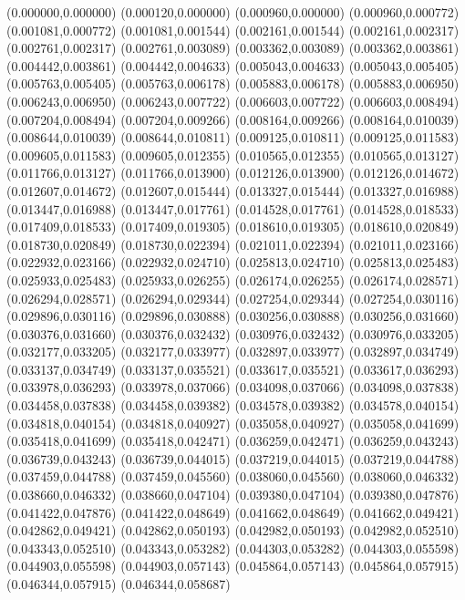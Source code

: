 (0.000000,0.000000)
(0.000120,0.000000)
(0.000960,0.000000)
(0.000960,0.000772)
(0.001081,0.000772)
(0.001081,0.001544)
(0.002161,0.001544)
(0.002161,0.002317)
(0.002761,0.002317)
(0.002761,0.003089)
(0.003362,0.003089)
(0.003362,0.003861)
(0.004442,0.003861)
(0.004442,0.004633)
(0.005043,0.004633)
(0.005043,0.005405)
(0.005763,0.005405)
(0.005763,0.006178)
(0.005883,0.006178)
(0.005883,0.006950)
(0.006243,0.006950)
(0.006243,0.007722)
(0.006603,0.007722)
(0.006603,0.008494)
(0.007204,0.008494)
(0.007204,0.009266)
(0.008164,0.009266)
(0.008164,0.010039)
(0.008644,0.010039)
(0.008644,0.010811)
(0.009125,0.010811)
(0.009125,0.011583)
(0.009605,0.011583)
(0.009605,0.012355)
(0.010565,0.012355)
(0.010565,0.013127)
(0.011766,0.013127)
(0.011766,0.013900)
(0.012126,0.013900)
(0.012126,0.014672)
(0.012607,0.014672)
(0.012607,0.015444)
(0.013327,0.015444)
(0.013327,0.016988)
(0.013447,0.016988)
(0.013447,0.017761)
(0.014528,0.017761)
(0.014528,0.018533)
(0.017409,0.018533)
(0.017409,0.019305)
(0.018610,0.019305)
(0.018610,0.020849)
(0.018730,0.020849)
(0.018730,0.022394)
(0.021011,0.022394)
(0.021011,0.023166)
(0.022932,0.023166)
(0.022932,0.024710)
(0.025813,0.024710)
(0.025813,0.025483)
(0.025933,0.025483)
(0.025933,0.026255)
(0.026174,0.026255)
(0.026174,0.028571)
(0.026294,0.028571)
(0.026294,0.029344)
(0.027254,0.029344)
(0.027254,0.030116)
(0.029896,0.030116)
(0.029896,0.030888)
(0.030256,0.030888)
(0.030256,0.031660)
(0.030376,0.031660)
(0.030376,0.032432)
(0.030976,0.032432)
(0.030976,0.033205)
(0.032177,0.033205)
(0.032177,0.033977)
(0.032897,0.033977)
(0.032897,0.034749)
(0.033137,0.034749)
(0.033137,0.035521)
(0.033617,0.035521)
(0.033617,0.036293)
(0.033978,0.036293)
(0.033978,0.037066)
(0.034098,0.037066)
(0.034098,0.037838)
(0.034458,0.037838)
(0.034458,0.039382)
(0.034578,0.039382)
(0.034578,0.040154)
(0.034818,0.040154)
(0.034818,0.040927)
(0.035058,0.040927)
(0.035058,0.041699)
(0.035418,0.041699)
(0.035418,0.042471)
(0.036259,0.042471)
(0.036259,0.043243)
(0.036739,0.043243)
(0.036739,0.044015)
(0.037219,0.044015)
(0.037219,0.044788)
(0.037459,0.044788)
(0.037459,0.045560)
(0.038060,0.045560)
(0.038060,0.046332)
(0.038660,0.046332)
(0.038660,0.047104)
(0.039380,0.047104)
(0.039380,0.047876)
(0.041422,0.047876)
(0.041422,0.048649)
(0.041662,0.048649)
(0.041662,0.049421)
(0.042862,0.049421)
(0.042862,0.050193)
(0.042982,0.050193)
(0.042982,0.052510)
(0.043343,0.052510)
(0.043343,0.053282)
(0.044303,0.053282)
(0.044303,0.055598)
(0.044903,0.055598)
(0.044903,0.057143)
(0.045864,0.057143)
(0.045864,0.057915)
(0.046344,0.057915)
(0.046344,0.058687)
